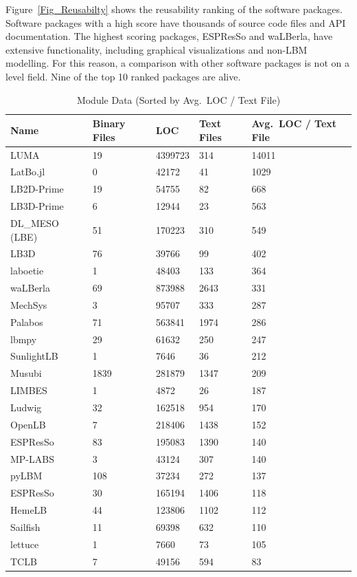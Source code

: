 \documentclass[final, 3p, times, authoryear]{elsarticle}
\newcommand{\esp}{ESPResSo\nolinebreak\hspace{-.05em}\raisebox{.4ex}{\small\bf
+}\nolinebreak\hspace{-.10em}\raisebox{.4ex}{\small\bf +}}
\begin{document}
Figure~\ref{Fig_Reusabilty} shows the reusability ranking of the software
packages. Software packages with a high score have thousands of source code
files and API documentation. The highest scoring packages, ESPResSo and
waLBerla, have extensive functionality, including graphical visualizations and
non-LBM modelling. For this reason, a comparison with other software packages is
not on a level field. Nine of the top 10 ranked packages are alive.

\begin{table}[ht!]
	\begin{center}
		\begin{tabular}{ p{3cm}p{2cm}p{2cm}p{2cm}p{3cm} }
			\toprule
			Name & Binary Files & LOC & Text Files & Avg.\ LOC / Text File \\
			\midrule
			LUMA & 19 & 4399723 & 314 & 14011 \\
			LatBo.jl & 0 & 42172 & 41& 1029 \\
			LB2D-Prime & 19 & 54755 & 82& 668 \\
			LB3D-Prime & 6 & 12944 & 23& 563 \\
			DL\_MESO (LBE) & 51 & 170223 & 310 & 549 \\
			LB3D & 76 & 39766 & 99 & 402 \\
			laboetie & 1 & 48403 & 133& 364 \\
			waLBerla & 69 & 873988 & 2643 & 331 \\
			MechSys & 3 & 95707 & 333 & 287 \\
			Palabos & 71 & 563841 & 1974 & 286 \\
			lbmpy & 29 & 61632 & 250 & 247 \\
			SunlightLB & 1 & 7646 & 36 & 212 \\
			Musubi & 1839 & 281879 & 1347 & 209 \\
			LIMBES & 1 & 4872 & 26 & 187 \\
			Ludwig & 32 & 162518 & 954 & 170 \\
			OpenLB & 7 & 218406 & 1438 & 152 \\
			ESPResSo & 83 & 195083 & 1390& 140 \\
			MP-LABS & 3 & 43124 & 307 & 140 \\
			pyLBM & 108 & 37234 & 272 & 137 \\
			\esp & 30 & 165194 & 1406& 118 \\
			HemeLB & 44 & 123806 & 1102& 112 \\
			Sailfish & 11 & 69398 & 632 & 110 \\
			lettuce & 1 & 7660 & 73 & 105 \\
			TCLB & 7 & 49156 & 594 & 83 \\
			\bottomrule
		\end{tabular}
		\caption{Module Data (Sorted by Avg.\ LOC / Text File)} \label{moduledata}
	\end{center}
\end{table}
\end{document}

